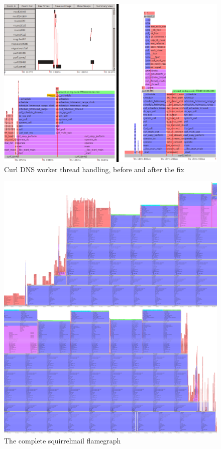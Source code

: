 \documentclass[10pt]{article}
\begin{document}
\begin{figure}[p]
\includegraphics[width=6.5in]{curlBeforeAndAfter}
\caption{Curl DNS worker thread handling, before and after the fix}
\label{fig:curl}
\end{figure}

\begin{figure}[p]
\includegraphics[width=6.5in]{squirrelbest}
\caption{The complete squirrelmail flamegraph}
\label{fig:sq}
\end{figure}
\end{document}
